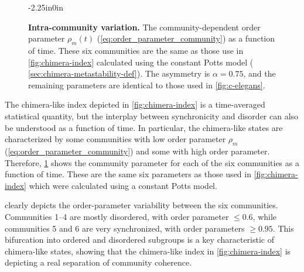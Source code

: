 \documentclass[10pt,letterpaper]{article}
\begin{document}
\begin{figure}
\begin{adjustwidth}{-2.25in}{0in}
  \centering
  \caption{
    \textbf{
			Intra-community variation.
    }
		The community-dependent order parameter $\rho_m(t)$
		(\cref{eq:order_parameter_community})
		as a function of time.
		These six communities are the same as those use in
		\cref{fig:chimera-index}
		calculated using the constant Potts
    model (\cf{} \cref{sec:chimera-metastability-def}).
		The asymmetry is $\alpha = 0.75$,
		and the remaining parameters are identical
		to those used in \cref{fig:c-elegans}.
  }\label{fig:order_param}
\end{adjustwidth}
\end{figure}

The chimera-like index
depicted in \cref{fig:chimera-index}
is a time-averaged statistical quantity,
but the interplay between synchronicity and disorder
can also be understood as a function of time.
In particular, the chimera-like states
are characterized by some communities with low
order parameter $\rho_m$
(\cref{eq:order_parameter_community})
and some with high order parameter.
Therefore,
\cref{fig:order_param}
shows the community parameter for
each of the six communities as a function of time.
These are the same six parameters as those used in
\cref{fig:chimera-index} which were calculated using a constant Potts
model.

 clearly depicts the order-parameter variability
between the six communities.
Communities 1--4 are mostly disordered, with order parameter $\le 0.6$,
while communities 5 and 6 are very synchronized, with order parameters
$\ge 0.95$.
This bifurcation into ordered and disordered subgroups is a key
characteristic of chimera-like states,
showing that the chimera-like index in \cref{fig:chimera-index}
is depicting a real separation of community coherence.
\end{document}
